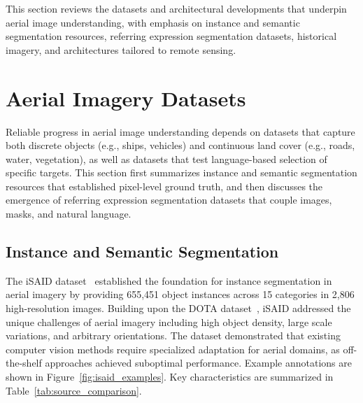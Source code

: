 \cleardoublepage
\label{chap:architecture}

This section reviews the datasets and architectural developments that underpin aerial image understanding, with emphasis on instance and semantic segmentation resources, referring expression segmentation datasets, historical imagery, and architectures tailored to remote sensing.

\section{Aerial Imagery Datasets}

Reliable progress in aerial image understanding depends on datasets that capture both discrete objects (e.g., ships, vehicles) and continuous land cover (e.g., roads, water, vegetation), as well as datasets that test language-based selection of specific targets. This section first summarizes instance and semantic segmentation resources that established pixel-level ground truth, and then discusses the emergence of referring expression segmentation datasets that couple images, masks, and natural language.

\subsection{Instance and Semantic Segmentation}

The iSAID dataset~\cite{zamir2019isaid} established the foundation for instance segmentation in aerial imagery by providing 655,451 object instances across 15 categories in 2,806 high-resolution images. Building upon the DOTA dataset~\cite{xia2018dota}, iSAID addressed the unique challenges of aerial imagery including high object density, large scale variations, and arbitrary orientations. The dataset demonstrated that existing computer vision methods require specialized adaptation for aerial domains, as off-the-shelf approaches achieved suboptimal performance. Example annotations are shown in Figure~\ref{fig:isaid_examples}. Key characteristics are summarized in Table~\ref{tab:source_comparison}.

